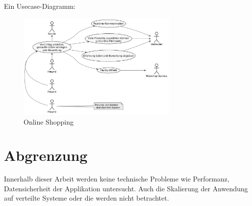 Ein Usecase-Diagramm:

\begin{figure}[htbp]
	\centering
	\includegraphics[width=0.7\textwidth]{uml-diagramme/online-shopping.png}
	\caption{Online Shopping}
	\label{fig:online-shopping}
\end{figure}


\section{Abgrenzung}

Innerhalb dieser Arbeit werden keine technische Probleme wie Performanz, Datensicherheit der Applikation untersucht. Auch die Skalierung der Anwendung auf verteilte Systeme oder die  werden nicht betrachtet.
